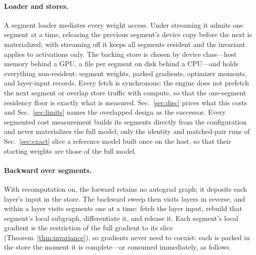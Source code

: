 \documentclass[journal]{IEEEtran}
\begin{document}
\paragraph{Loader and stores.}
A segment loader mediates every weight access. Under streaming it admits one
segment at a time, releasing the previous segment's device copy before the
next is materialized; with streaming off it keeps all segments resident and
the invariant applies to activations only. The backing store is chosen by
device class---host memory behind a GPU, a file per segment on disk behind
a CPU---and holds everything non-resident: segment weights, parked
gradients, optimizer moments, and layer-input records. Every fetch is
synchronous: the engine does not prefetch the next segment or overlap store
traffic with compute, so that the one-segment residency floor is exactly
what is measured. Sec.~\ref{sec:disc} prices what this costs and
Sec.~\ref{sec:limits} names the overlapped design as the successor. Every
segmented cost measurement builds its segments directly from the
configuration and never materializes the full model; only the identity and
matched-pair runs
of Sec.~\ref{sec:exact} slice a reference model built once on the host, so
that their starting weights are those of the full model.

\paragraph{Backward over segments.}
With recomputation on, the forward retains no autograd graph; it deposits
each layer's input in the store. The backward sweep then visits layers in
reverse, and within a layer visits segments one at a time: fetch the layer
input, rebuild that segment's local subgraph, differentiate it, and release
it. Each segment's local gradient is the restriction of the full gradient to
its slice (Theorem~\ref{thm:invariance}), so gradients never need to coexist:
each is parked in the store the moment it is complete---or consumed
immediately, as follows.
\end{document}
